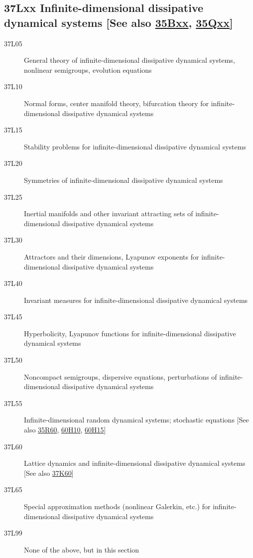 \documentclass[letterpaper]{article}
\begin{document}
\subsection*{37Lxx  Infinite-dimensional dissipative dynamical systems [See also \hyperref[35Bxx]{35Bxx}, \hyperref[35Qxx]{35Qxx}] }\label{37Lxx}
\begin{description} 
\item [37L05]\label{37L05} General theory of infinite-dimensional dissipative dynamical systems, nonlinear semigroups, evolution equations
\item [37L10]\label{37L10} Normal forms, center manifold theory, bifurcation theory for infinite-dimensional dissipative dynamical systems
\item [37L15]\label{37L15} Stability problems for infinite-dimensional dissipative dynamical systems
\item [37L20]\label{37L20} Symmetries of infinite-dimensional dissipative dynamical systems
\item [37L25]\label{37L25} Inertial manifolds and other invariant attracting sets of infinite-dimensional dissipative dynamical systems
\item [37L30]\label{37L30} Attractors and their dimensions, Lyapunov exponents for infinite-dimensional dissipative dynamical systems
\item [37L40]\label{37L40} Invariant measures for infinite-dimensional dissipative dynamical systems
\item [37L45]\label{37L45} Hyperbolicity, Lyapunov functions for infinite-dimensional dissipative dynamical systems
\item [37L50]\label{37L50} Noncompact semigroups, dispersive equations, perturbations of infinite-dimensional dissipative dynamical systems
\item [37L55]\label{37L55} Infinite-dimensional random dynamical systems; stochastic equations [See also \hyperref[35R60]{35R60}, \hyperref[60H10]{60H10}, \hyperref[60H15]{60H15}]
\item [37L60]\label{37L60} Lattice dynamics and infinite-dimensional dissipative dynamical systems [See also \hyperref[37K60]{37K60}]
\item [37L65]\label{37L65} Special approximation methods (nonlinear Galerkin, etc.) for infinite-dimensional dissipative dynamical systems
\item [37L99]\label{37L99} None of the above, but in this section
\end{description}
\end{document}

